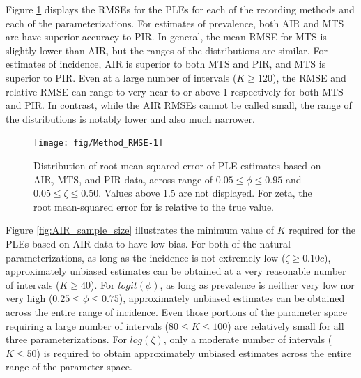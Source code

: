 \documentclass[man, noextraspace, floatsintext]{apa6}\usepackage[]{graphicx}\usepackage[]{color}
\newenvironment{knitrout}{}{} %
\begin{document}
Figure \ref{fig:Method_RMSE} displays the RMSEs for the PLEs for each of the recording methods and each of the parameterizations. For estimates of prevalence, both AIR and MTS are have superior accuracy to PIR. In general, the mean RMSE for MTS is slightly lower than AIR, but the ranges of the distributions are similar. For estimates of incidence, AIR is superior to both MTS and PIR, and MTS is superior to PIR. Even at a large number of intervals ($K \geq 120$), the RMSE and relative RMSE can range to very near to or above 1 respectively for both MTS and PIR. In contrast, while the AIR RMSEs cannot be called small, the range of the distributions is notably lower and also much narrower.
\begin{knitrout}
\color{fgcolor}\begin{figure}

{\centering \texttt{[image: fig/Method\_RMSE-1]} 

}

\caption[Distribution of root mean-squared error of PLE estimates based on AIR, MTS, and PIR data, across range of ]{Distribution of root mean-squared error of PLE estimates based on AIR, MTS, and PIR data, across range of $0.05 \leq \phi \leq 0.95$ and $0.05 \leq \zeta \leq 0.50$. Values above 1.5 are not displayed. For zeta, the root mean-squared error for is relative to the true value.}\label{fig:Method_RMSE}
\end{figure}


\end{knitrout}

Figure \ref{fig:AIR_sample_size} illustrates the minimum value of $K$ required for the PLEs based on AIR data to have low bias. For both of the natural parameterizations, as long as the incidence is not extremely low ($\zeta \geq 0.10c$), approximately unbiased estimates can be obtained at a very reasonable number of intervals ($K \geq 40$). For $logit(\phi)$, as long as prevalence is neither very low nor very high ($0.25 \leq \phi \leq 0.75$), approximately unbiased estimates can be obtained across the entire range of incidence. Even those portions of the parameter space requiring a large number of intervals ($80 \leq K \leq 100$) are relatively small for all three parameterizations. For $log(\zeta)$, only a moderate number of intervals ($K \leq 50$) is required to obtain approximately unbiased estimates across the entire range of the parameter space.
\end{document}
